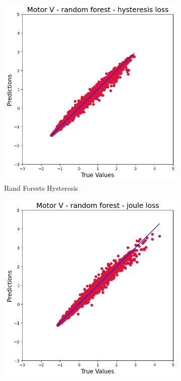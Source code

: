 \documentclass{article}
\begin{document}
\begin{figure}[!htbp]
    \vspace{0.3cm}
    
    \begin{subfigure}[b]{0.23\textwidth}
        \centering
        \includegraphics[width=\textwidth]{images/V/rand_for_hysteresis.png}
        \caption{Rand Forests Hysteresis}
    \end{subfigure}
    \hfill
    \begin{subfigure}[b]{0.23\textwidth}
        \centering
        \includegraphics[width=\textwidth]{images/V/rand_for_joule.png}

\end{subfigure}
\end{figure}
\end{document}
